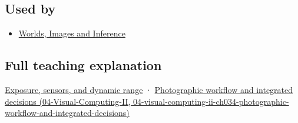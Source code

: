 \subsection{Used by}\label{appendix-92d45cdf2afc-used-by}

\begin{itemize}
\tightlist
\item
  \href{Continuous\%20Notes/University\%20-\%20Worlds,\%20Images\%20and\%20Inference\%20-\%20Graphics,\%20Vision\%20and\%20Photography}{Worlds, Images and Inference}
\end{itemize}

\subsection{Full teaching explanation}\label{appendix-92d45cdf2afc-full-teaching-explanation}

\hyperref[03-visual-computing-i-ch003-exposure-sensors-and-dynamic-range]{Exposure, sensors, and dynamic range} · \href{../04-Visual-Computing-II/main.pdf\#nameddest=04-visual-computing-ii-ch034-photographic-workflow-and-integrated-decisions}{Photographic workflow and integrated decisions (04-Visual-Computing-II, 04-visual-computing-ii-ch034-photographic-workflow-and-integrated-decisions)}
